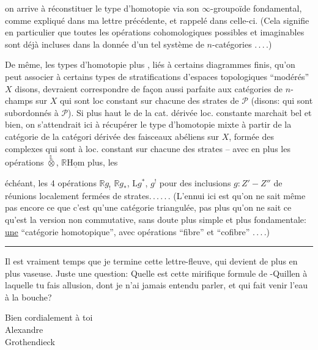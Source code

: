 on arrive à réconstituer le type d'homotopie via son $\infty$-groupoïde fondamental, comme expliqué dans ma lettre précédente, et rappelé dans celle-ci. (Cela signifie en particulier que toutes les opérations cohomologiques possibles et imaginables sont déjà incluses dans la donnée d'un tel système de $n$-catégories .\,.\,.\,.) 

De même, les types d'homotopie plus , liés à certains diagrammes finis, qu'on peut associer à certains types de stratifications  d'espaces topologiques ``modérés'' $X$ disons, devraient correspondre de façon aussi parfaite aux catégories de $n$-champs sur $X$ qui sont loc constant sur chacune des strates de $\mathcal{P}$ (disons: qui sont subordonnés à $\mathcal{P}$). Si plus haut le  de la cat. dérivée loc. constante marchait bel et bien, on s'attendrait ici à récupérer le type d'homotopie mixte à partir de la catégorie de la catégori dérivée des faisceaux abéliens sur $X$, formée des complexes qui sont à  loc. constant sur chacune des strates -- avec en plus les opérations $\overset{\mathbb{L}}{\otimes}$, $\mathbb{R}\underline{\mathrm{Hom}}$ plus, les

 échéant, les 4 opérations $\mathbb{R}g_!$ $\mathbb{R}g_*$, $\mathrm{L}g^*$, $g^!$ pour des inclusions $g:Z'-Z''$ de réunions localement fermées de strates.\,.\,.\,.\,.\,. (L'ennui ici est qu'on ne sait même pas encore ce que c'est qu'une catégorie triangulée, pas plus qu'on ne sait ce qu'est la version non commutative, sans doute plus simple et plus fondamentale: \uline{une} ``catégorie homotopique'', avec opérations ``fibre'' et ``cofibre'' .\,.\,.\,.)

\begin{center}\rule{0.41\linewidth}{0.4pt}\end{center}

Il est vraiment temps que je termine cette lettre-fleuve, qui devient de plus en plus vaseuse. Juste une question: Quelle est cette mirifique formule de -Quillen à laquelle tu fais allusion, dont je n'ai jamais entendu parler, et qui fait venir l'eau à la bouche?

Bien cordialement à toi\\
\hspace*{0.42\linewidth}Alexandre\\
\hspace*{0.52\linewidth}Grothendieck\\
